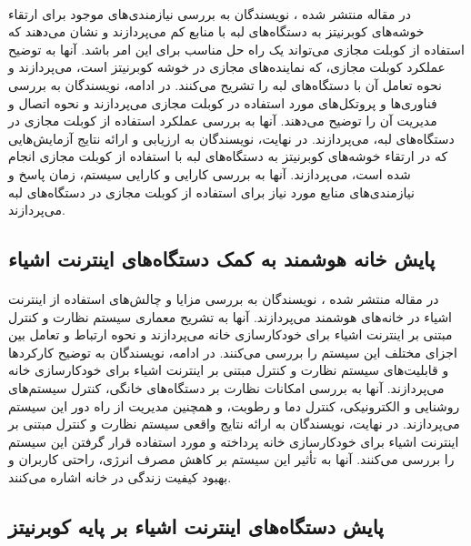 \paragraph{}{
    در مقاله منتشر شده \cite{exteing-kubernetes-to-low-resource-edge-devices}،
    نویسندگان به بررسی نیازمندی‌های موجود برای ارتقاء خوشه‌های کوبرنیتز به دستگاه‌های لبه
    با منابع کم می‌پردازند و نشان می‌دهند که استفاده از کوبلت مجازی می‌تواند یک راه حل
    مناسب برای این امر باشد. آنها به توضیح عملکرد کوبلت مجازی، که نماینده‌های مجازی در
    خوشه کوبرنیتز است، می‌پردازند و نحوه تعامل آن با دستگاه‌های لبه را تشریح می‌کنند. در
    ادامه، نویسندگان به بررسی فناوری‌ها و پروتکل‌های مورد استفاده در کوبلت مجازی می‌پردازند
    و نحوه اتصال و مدیریت آن را توضیح می‌دهند. آنها به بررسی عملکرد استفاده از کوبلت مجازی 
    در دستگاه‌های لبه، می‌پردازند. در نهایت، نویسندگان به ارزیابی و ارائه نتایج آزمایش‌هایی
    که در ارتقاء خوشه‌های کوبرنیتز به دستگاه‌های لبه با استفاده از کوبلت مجازی انجام
    شده است، می‌پردازند. آنها به بررسی کارایی و کارایی سیستم، زمان پاسخ و نیازمندی‌های 
    منابع مورد نیاز برای استفاده از کوبلت مجازی در دستگاه‌های لبه می‌پردازند.
}

\subsection{
    پایش خانه هوشمند به کمک دستگاه‌های اینترنت اشیاء
}
\label{subsec:iot_based_monitoring}
\paragraph{}{
    در مقاله منتشر شده \cite{iot_based_monitoring}،
    نویسندگان به بررسی مزایا و چالش‌های استفاده از اینترنت اشیاء در خانه‌های هوشمند می‌پردازند.
    آنها به تشریح معماری سیستم نظارت و کنترل مبتنی بر اینترنت اشیاء برای خودکارسازی خانه
    می‌پردازند و نحوه ارتباط و تعامل بین اجزای مختلف این سیستم را بررسی می‌کنند. در ادامه، 
    نویسندگان به توضیح کارکردها و قابلیت‌های سیستم نظارت و کنترل مبتنی بر اینترنت اشیاء برای
    خودکارسازی خانه می‌پردازند. آنها به بررسی امکانات نظارت بر دستگاه‌های خانگی، کنترل سیستم‌های 
    روشنایی و الکترونیکی، کنترل دما و رطوبت، و همچنین مدیریت از راه دور این سیستم می‌پردازند. 
    در نهایت، نویسندگان به ارائه نتایج واقعی سیستم نظارت و کنترل مبتنی بر اینترنت اشیاء برای 
    خودکارسازی خانه پرداخته و مورد استفاده قرار گرفتن این سیستم را بررسی می‌کنند. آنها به تأثیر
    این سیستم بر کاهش مصرف انرژی، راحتی کاربران و بهبود کیفیت زندگی در خانه اشاره می‌کنند.
}

\subsection{
    پایش دستگاه‌های اینترنت اشیاء بر پایه کوبرنیتز
}
\label{subsec:iot_device_management}
